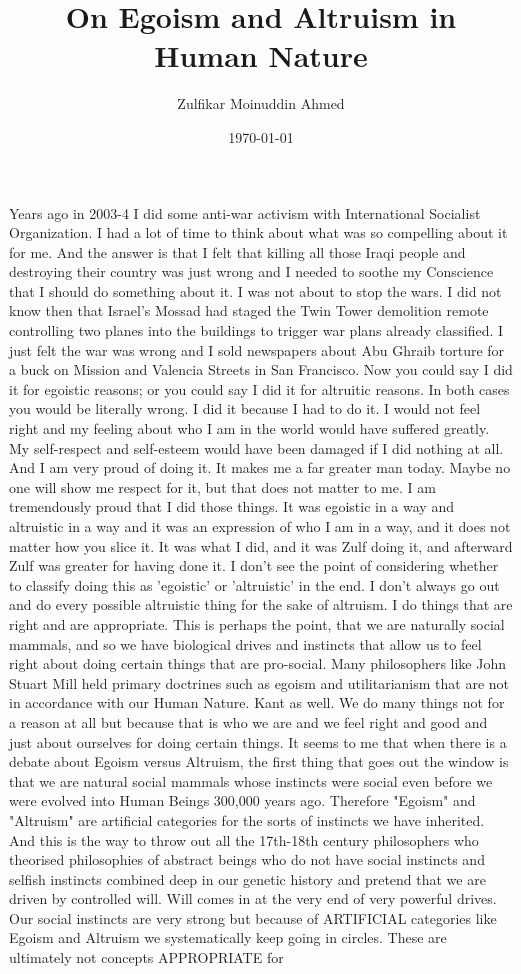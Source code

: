 \documentclass{amsart}
\title{On Egoism and Altruism in Human Nature}
\author{Zulfikar Moinuddin Ahmed}
\date{\today}
\begin{document}
\maketitle

Years ago in 2003-4 I did some anti-war activism with International Socialist Organization.  I had a lot of time to think about what was so compelling about it for me.  And the answer is that I felt that killing all those Iraqi people and destroying their country was just wrong and I needed to soothe my Conscience that I should do something about it.  I was not about to stop the wars.  I did not know then that Israel's Mossad had staged the Twin Tower demolition remote controlling two planes into the buildings to trigger war plans already classified.  I just felt the war was wrong and I sold newspapers about Abu Ghraib torture for a buck on Mission and Valencia Streets in San Francisco.  Now you could say I did it for egoistic reasons; or you could say I did it for altruitic reasons.  In both cases you would be literally wrong.  I did it because I had to do it.  I would not feel right and my feeling about who I am in the world would have suffered greatly.  My self-respect and self-esteem would have been damaged if I did nothing at all.  And I am very proud of doing it.  It makes me a far greater man today.  Maybe no one will show me respect for it, but that does not matter to me.  I am tremendously proud that I did those things.  It was egoistic in a way and altruistic in a way and it was an expression of who I am in a way, and it does not matter how you slice it.  It was what I did, and it was Zulf doing it, and afterward Zulf was greater for having done it.  I don't see the point of considering whether to classify doing this as 'egoistic' or 'altruistic' in the end.  I don't always go out and do every possible altruistic thing for the sake of altruism.  I do things that are right and are appropriate.  This is perhaps the point, that we are naturally social mammals, and so we have biological drives and instincts that allow us to feel right about doing certain things that are pro-social.  Many philosophers like John Stuart Mill held primary doctrines such as egoism and utilitarianism that are not in accordance with our Human Nature.  Kant as well.  We do many things not for a reason at all but because that is who we are and we feel right and good and just about ourselves for doing certain things.  It seems to me that when there is a debate about Egoism versus Altruism, the first thing that goes out the window is that we are natural social mammals whose instincts were social even before we were evolved into Human Beings 300,000 years ago.  Therefore "Egoism" and "Altruism" are artificial categories for the sorts of instincts we have inherited. And this is the way to throw out all the 17th-18th century philosophers who theorised philosophies of abstract beings who do not have social instincts and selfish instincts combined deep in our genetic history and pretend that we are driven by controlled will.  Will comes in at the very end of very powerful drives.  Our social instincts are very strong but because of ARTIFICIAL categories like Egoism and Altruism we systematically keep going in circles.  These are ultimately not concepts APPROPRIATE for 
\end{document}
